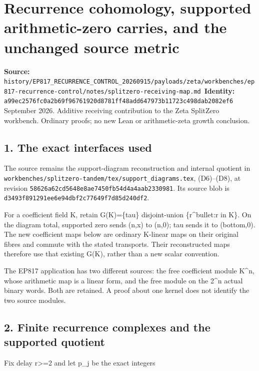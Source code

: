 \chapter{Recurrence cohomology, supported arithmetic-zero carries, and the unchanged source metric}
\label{chapter:15_splitzero-receiving-map}
{\small\noindent\textbf{Source:} \nolinkurl{history/EP817_RECURRENCE_CONTROL_20260915/payloads/zeta/workbenches/ep817-recurrence-control/notes/splitzero-receiving-map.md}\
\textbf{Identity:} \nolinkurl{a99ec2576fc0a2b69f96761920d8781ff48add647973b11723c498dab2082ef6}}
 September 2026. Additive receiving contribution to the Zeta SplitZero workbench. Ordinary proofs; no new Lean or arithmetic-zeta growth conclusion.

\section{1. The exact interfaces used}\label{n15-the-exact-interfaces-used}

The source remains the support-diagram reconstruction and internal quotient in \nolinkurl{workbenches/splitzero-tandem/tex/support_diagrams.tex}, (D6)--(D8), at revision \nolinkurl{58626a62cd5648e8ae7450fb54d4a4aab2330981}. Its source blob is \nolinkurl{d3493f891291ee6e94dbf2c77649f7d85d240df2}.

For a coefficient field K, retain G(K)=\{tau\} disjoint-union \{r\^{}bullet:r in K\}. On the diagram total, supported zero sends (n,x) to (n,0); tau sends it to (bottom,0). The new coefficient maps below are ordinary K-linear maps on their original fibres and commute with the stated transports. Their reconstructed maps therefore use that existing G(K), rather than a new scalar convention.

The EP817 application has two different sources: the free coefficient module K\^{}n, whose arithmetic map is a linear form, and the free module on the 2\^{}n actual binary words. Both are retained. A proof about one kernel does not identify the two source modules.

\section{2. Finite recurrence complexes and the supported quotient}\label{n15-finite-recurrence-complexes-and-the-supported-quotient}

Fix delay r\textgreater=2 and let p\_j be the exact integers

